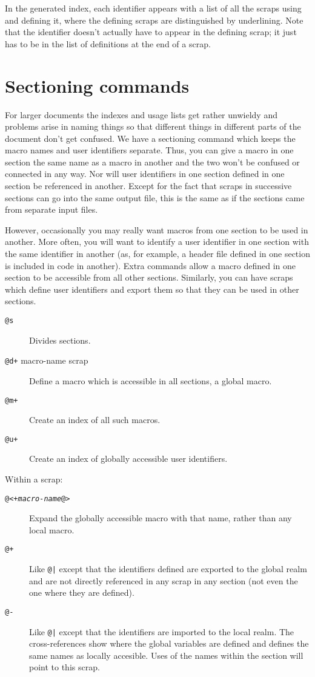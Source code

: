 \documentclass{report}
\begin{document}
In the generated index, each identifier appears with a list of all the
scraps using and defining it, where the defining scraps are
distinguished by underlining. Note that the identifier doesn't
actually have to appear in the defining scrap; it just has to be in
the list of definitions at the end of a scrap.

\section{Sectioning commands}
For larger documents the indexes and usage lists get rather
unwieldy and problems arise in naming things so that different
things in different parts of the document don't get confused. We
have a sectioning command which keeps the macro names and user
identifiers separate. Thus, you can give a macro in one section
the same name as a macro in another and the two won't be confused
or connected in any way. Nor will user identifiers in one section
defined in one section be referenced in another. Except for the
fact that scraps in successive sections can go into the same
output file, this is the same as if the sections came from
separate input files.

However, occasionally you may really want macros from one section
to be used in another. More often, you will want to identify a
user identifier in one section with the same identifier in
another (as, for example, a header file defined in one section is
included in code in another). Extra commands allow a macro
defined in one section to be accessible from all other sections.
Similarly, you can have scraps which define user identifiers and
export them so that they can be used in other sections.

\begin{description}
\item[{\tt @s}] Divides sections.
\item[{\tt @d+} macro-name scrap] Define a macro which is
accessible in all sections, a global macro.
\item[{\tt @m+}] Create an index of all such macros.
\item[{\tt @u+}] Create an index of globally accessible
user identifiers.
\end{description}

Within a scrap:
\begin{description}
\item[\tt @<+{\em macro-name\/}@>]
Expand the globally accessible macro with that name, rather than
any local macro.
\item[{\tt @+}] Like \verb"@|" except that the identifiers
defined are exported to the global realm and are not directly
referenced in any scrap in any section (not even the one where
they are defined).
\item[{\tt @-}] Like \verb"@|" except that the identifiers
are imported to the local realm. The cross-references show where
the global variables are defined and defines the same names as
locally accesible. Uses of the names within the section will
point to this scrap.
\end{description}
\end{document}
